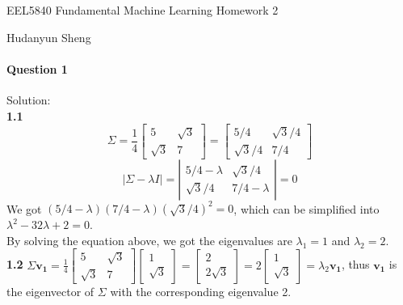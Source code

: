 \documentclass[a4paper]{article}
\begin{document}
\begin{spacing}{2.0}
\begin{flushleft}\begin{huge}EEL5840 Fundamental Machine Learning   Homework 2\end{huge}\end{flushleft}
\begin{flushright}\begin{Large} Hudanyun Sheng \end{Large}\end{flushright}

\paragraph{\huge\textbf{ Question 1} } \large{Solution:\\}
	\normalsize 
	\setcounter{section}{1}
	\textbf{1.1}  $$\Sigma = \displaystyle\frac{1}{4}\left[ \begin{matrix} 5  &  \sqrt{3}\\ \sqrt{3}  &  7\end{matrix}\right] 
													 = \left[ \begin{matrix} 5/4  &  \sqrt{3}/4\\  \sqrt{3}/4  &  7/4\end{matrix}\right]$$
			  $$|\Sigma - \lambda I |= \left|\begin{matrix} 5/4 - \lambda  &  \sqrt{3}/4  \\   \sqrt{3}/4  &  7/4 - \lambda  \end{matrix} \right| = 0$$
			  We got $(5/4 - \lambda)(7/4 - \lambda) (\sqrt{3}/4)^2 = 0$, which can be simplified into $\lambda^2 - 32\lambda + 2 = 0$.\\
			  By solving the equation above, we got the eigenvalues are $\lambda_1 = 1$ and $\lambda_2 = 2$.\\
			  
	\noindent		
	\textbf{1.2}
	 $\Sigma \mathbf{v_1} = \displaystyle\frac{1}{4}\left[ \begin{matrix} 5 & \sqrt{3} \\  \sqrt{3} & 7\end{matrix}\right]\left[ \begin{matrix} 1 \\  				 \sqrt{3}\end{matrix}\right] = \left[ \begin{matrix} 2 \\  2\sqrt{3} \end{matrix}\right] = 2\left[ \begin{matrix} 1 \\  \sqrt{3} \end{matrix}\right] = 				 \lambda_2\mathbf{v_1}$, thus $\mathbf{v_1}$ is the eigenvector of $\Sigma$ with the corresponding eigenvalue 2.\\
	 

\end{spacing}
\end{document}
